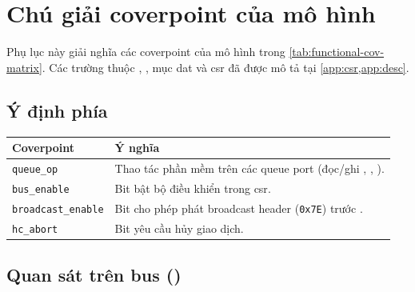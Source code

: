 \chapter{Chú giải coverpoint của mô hình \FunctionalCoverage{}}
\label{app:cov-legend}

Phụ lục này giải nghĩa các coverpoint của mô hình \FunctionalCoverage{} trong
\cref{tab:functional-cov-matrix}. Các trường thuộc \CommandDescriptor{}, \ResponseDescriptor{},
mục \gls{dat} và \gls{csr} đã được mô tả tại \cref{app:csr,app:desc}.

\section*{Ý định phía \Host{}}

\begin{longtable}{L{4.2cm} L{8.4cm}}
  \toprule
  \textbf{Coverpoint} & \textbf{Ý nghĩa} \\
  \midrule
  \endhead
  \texttt{queue\_op}         & Thao tác phần mềm trên các queue port (đọc/ghi \CommandFifo{}, \TxRxFifo{}, \ResponseFifo{}). \\
  \texttt{bus\_enable}       & Bit bật bộ điều khiển trong \gls{csr}. \\
  \texttt{broadcast\_enable} & Bit cho phép phát broadcast header (\texttt{0x7E}) trước \AddressHeader{}. \\
  \texttt{hc\_abort}         & Bit \Host{} yêu cầu hủy giao dịch. \\
  \bottomrule
\end{longtable}

\section*{Quan sát trên bus (\IThreeCCoverage{})}

